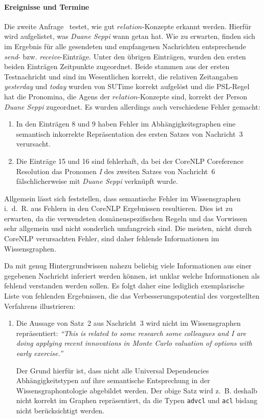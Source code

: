 \paragraph{Ereignisse und Termine}
Die zweite Anfrage~ testet, wie gut $relation$-Konzepte erkannt werden.
Hierfür wird aufgelistet, was \textit{Duane Seppi} wann getan hat.
Wie zu erwarten, finden sich im Ergebnis für alle gesendeten und empfangenen Nachrichten entsprechende \textit{send}- bzw. \textit{receive}-Einträge.
Unter den übrigen Einträgen, wurden den ersten beiden Einträgen Zeitpunkte zugeordnet.
Beide stammen aus der ersten Testnachricht und sind im Wesentlichen korrekt, die relativen Zeitangaben \textit{yesterday} und \textit{today} wurden von SUTime korrekt aufgelöst und die PSL-Regel  hat die Pronomina, die Agens der $relation$-Konzepte sind, korrekt der Person \textit{Duane Seppi} zugeordnet.
Es wurden allerdings auch verschiedene Fehler gemacht:
\begin{enumerate}
	\item In den Einträgen 8 und 9 haben Fehler im Abhängigkeitsgraphen eine semantisch inkorrekte Repräsentation des ersten Satzes von Nachricht~3 verursacht.
	\item Die Einträge 15 und 16 sind fehlerhaft, da bei der CoreNLP Coreference Resolution das Pronomen \textit{I} des zweiten Satzes von Nachricht~6 fälschlicherweise mit \textit{Duane Seppi} verknüpft wurde.
\end{enumerate}
Allgemein lässt sich feststellen, dass semantische Fehler im Wissensgraphen i.~d.~R. aus Fehlern in den CoreNLP Ergebnissen resultieren.
Dies ist zu erwarten, da die verwendeten domänenspezifischen Regeln und das Vorwissen sehr allgemein und nicht sonderlich umfangreich sind.
Die meisten, nicht durch CoreNLP verursachten Fehler, sind daher fehlende Informationen im Wissensgraphen.

Da mit genug Hintergrundwissen nahezu beliebig viele Informationen aus einer gegebenen Nachricht inferiert werden können, ist unklar welche Informationen als fehlend verstanden werden sollen.
Es folgt daher eine lediglich exemplarische Liste von fehlenden Ergebnissen, die das Verbesserungspotential des vorgestellten Verfahrens illustrieren:
\begin{enumerate}
	\item Die Aussage von Satz~2 aus Nachricht~3 wird nicht im Wissensgraphen repräsentiert:
		\textit{``This is related to some research some colleagues and I are doing applying recent innovations in Monte Carlo valuation of options with early exercise.''}

		Der Grund hierfür ist, dass nicht alle Universal Dependencies Abhängigkeitstypen auf ihre semantische Entsprechung in der Wissensgraphontologie abgebildet werden.
		Der obige Satz wird z.~B. deshalb nicht korrekt im Graphen repräsentiert, da die Typen \texttt{advcl} und \texttt{acl} bislang nicht berücksichtigt werden.
\end{enumerate}

